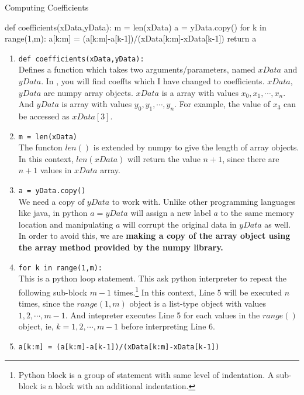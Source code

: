 \begin{program}Computing Coefficients
	\begin{python}
		def coefficients(xData,yData):
			m = len(xData)
			a = yData.copy()
			for k in range(1,m):
				a[k:m] = (a[k:m]-a[k-1])/(xData[k:m]-xData[k-1])
			return a
	\end{python}
\end{program}
\begin{commentary}
\begin{enumerate}[label=Line \arabic*]
	\item \texttt{def coefficients(xData,yData):} \\
		Defines a function which takes two arguments/parameters, named $xData$ and $yData$. In \cite[3.2]{kiusalaas}, you will find coeffts which I have changed to coefficients. $xData$,$yData$ are numpy array objects. $xData$ is a array with values $x_0,x_1,\cdots,x_n$. And $yData$ is array with values $y_0,y_1,\cdots,y_n$. For example, the value of $x_3$ can be accessed as $xData[3]$.
	\item \texttt{m = len(xData)}\\
		The functon $len()$ is extended by numpy to give the length of array objects. In this context, $len(xData)$ will return the value $n+1$, since there are $n+1$ values in $xData$ array.
	\item \texttt{a = yData.copy()}\\
		We need a copy of $yData$ to work with. Unlike other programming languages like java, in python $a = yData$ will assign a new label $a$ to the same memory location and manipulating $a$ will corrupt the original data in $yData$ as well. In order to avoid this, we are \textbf{making a copy of the array object using the array method provided by the numpy library.}
	\item \texttt{for k in range(1,m):}\\
		This is a python loop statement. This ask python interpreter to repeat the following sub-block $m-1$ times.\footnote{Python block is a group of statement with same level of indentation. A sub-block is a block with an additional indentation.} In this context, Line 5 will be executed $n$ times, since the $range(1,m)$ object is a list-type object with values $1,2,\cdots,m-1$. And intepreter executes Line 5 for each values in the $range()$ object, ie, $k=1,2,\cdots, m-1$ before interpreting Line 6.
	\item \texttt{a[k:m] = (a[k:m]-a[k-1])/(xData[k:m]-xData[k-1])}\\

\end{enumerate}
\end{commentary}
